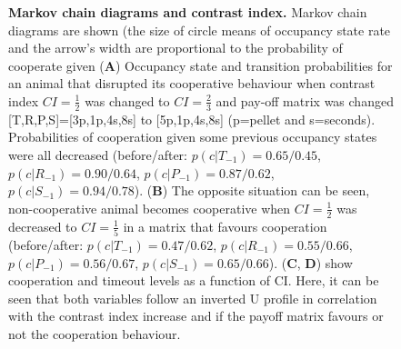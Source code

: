\documentclass[10pt,letterpaper]{article}
\begin{document}
\begin{figure}[!h]
\caption{{\bf Markov chain diagrams and contrast index.} 
Markov chain diagrams are shown (the size of circle means of occupancy state rate and the arrow's width are proportional to the probability of cooperate given  ({\bf A}) Occupancy state and transition probabilities for an animal that disrupted its cooperative behaviour when contrast index $CI=\frac{1}{2}$ was changed to $CI=\frac{2}{3}$ and pay-off matrix was changed [T,R,P,S]=[3p,1p,4s,8s] to [5p,1p,4s,8s] (p=pellet and s=seconds). Probabilities of cooperation given some  previous occupancy states were all decreased (before/after: $p(c|T_{-1})= 0.65/0.45$, $p(c|R_{-1})= 0.90/0.64$, $p(c|P_{-1})= 0.87/0.62$, $p(c|S_{-1})= 0.94/0.78$). ({\bf B}) The opposite situation can be seen, non-cooperative animal becomes cooperative when $CI=\frac{1}{2}$ was decreased to $CI=\frac{1}{5}$ in a matrix that favours cooperation (before/after: $p(c|T_{-1})= 0.47/0.62$, $p(c|R_{-1})= 0.55/0.66$, $p(c|P_{-1})= 0.56/0.67$, $p(c|S_{-1})= 0.65/0.66$). ({\bf C}, {\bf D}) show cooperation and timeout levels as a function of CI. Here, it can be seen that both variables follow an inverted U profile in correlation with the contrast index increase and if the payoff matrix favours or not the cooperation behaviour.
}
\label{figU}
\end{figure}

\end{document}
